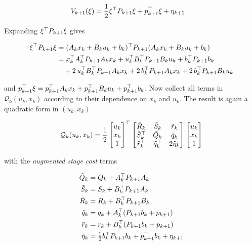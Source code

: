 \begin{align*}
V_{k+1}(\xi) &= \frac{1}{2} \xi^\top P_{k+1} \xi + p_{k+1}^\top \xi + \eta_{k+1}
\end{align*}

Expanding $\xi^\top P_{k+1} \xi$ gives

\begin{align*}
\xi^\top P_{k+1} \xi &= (A_k x_k + B_k u_k + b_k)^\top P_{k+1} (A_k x_k + B_k u_k + b_k) \\
&= x_k^\top A_k^\top P_{k+1} A_k x_k + u_k^\top B_k^\top P_{k+1} B_k u_k + b_k^\top P_{k+1} b_k \\
&\quad + 2\, u_k^\top B_k^\top P_{k+1} A_k x_k + 2\, b_k^\top P_{k+1} A_k x_k + 2\, b_k^\top P_{k+1} B_k u_k
\end{align*}

and $p_{k+1}^\top \xi = p_{k+1}^\top A_k x_k + p_{k+1}^\top B_k u_k + p_{k+1}^\top b_k$.
Now collect all terms in $\mathcal{Q}_k(u_k, x_k)$ according to their dependence on $x_k$ and $u_k$.
The result is again a quadratic form in $(u_k, x_k)$

\[
\mathcal{Q}_k(u_k, x_k) = \frac{1}{2}
\begin{bmatrix} u_k \\ x_k \\ 1 \end{bmatrix}^\top
\begin{bmatrix}
    \tilde{R}_k   & \tilde{S}_k  & \tilde{r}_k \\
    \tilde{S}_k^\top & \tilde{Q}_k  & \tilde{q}_k \\
    \tilde{r}_k^\top & \tilde{q}_k^\top & 2\tilde{\eta}_k
\end{bmatrix}
\begin{bmatrix} u_k \\ x_k \\ 1 \end{bmatrix}
\]

with the \textit{augmented stage cost} terms

\begin{align}
\tilde{Q}_k &= Q_k + A_k^\top P_{k+1} A_k \label{eq:Qtilde} \\
\tilde{S}_k &= S_k + B_k^\top P_{k+1} A_k \label{eq:Stilde} \\
\tilde{R}_k &= R_k + B_k^\top P_{k+1} B_k \label{eq:Rtilde} \\
\tilde{q}_k &= q_k + A_k^\top (P_{k+1} b_k + p_{k+1}) \label{eq:qtilde} \\
\tilde{r}_k &= r_k + B_k^\top (P_{k+1} b_k + p_{k+1}) \label{eq:rtilde} \\
\tilde{\eta}_k &= \tfrac{1}{2} b_k^\top P_{k+1} b_k + p_{k+1}^\top b_k + \eta_{k+1} \label{eq:etatilde}
\end{align}


